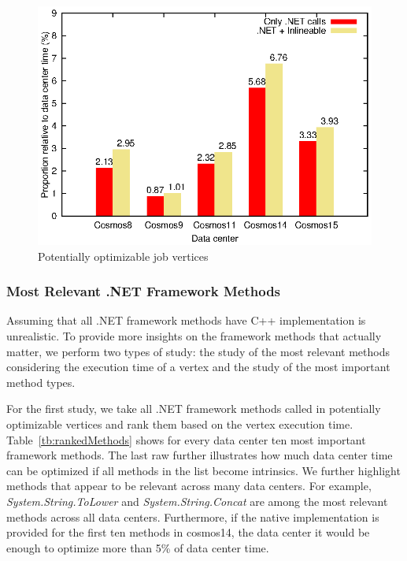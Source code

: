 \begin{figure}[ht]
\includegraphics[scale=0.8]{graphs/potentiallyOptimizable}

\caption{Potentially optimizable job vertices}
\label{fig:potentially}
\end{figure}

\subsubsection{Most Relevant .NET Framework Methods}
Assuming that all .NET framework methods have C++ implementation is unrealistic. 
To provide more insights on the framework methods that actually matter, we perform two types of study:
the study of the most relevant methods considering the execution time of a vertex and the study of the most important method types. 

For the first study, we take all .NET framework methods called in potentially optimizable vertices and rank them based on the vertex execution time. 
Table~\ref{tb:rankedMethods} shows for every data center ten most important framework methods. 
The last raw further illustrates how much data center time can be optimized if all methods in the list become intrinsics.
We further highlight methods that appear to be relevant across many data centers.
For example, \emph{System.String.ToLower} and \emph{System.String.Concat} are among the most relevant methods across all data centers.
Furthermore, if the native implementation is provided for the first ten methods in cosmos14, the data center it would be enough to optimize more than 5\% of data center time.


